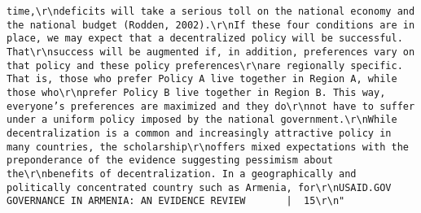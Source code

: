 \documentclass[
]{article}
\begin{document}
\begin{verbatim}
time,\r\ndeficits will take a serious toll on the national economy and the national budget (Rodden, 2002).\r\nIf these four conditions are in place, we may expect that a decentralized policy will be successful. That\r\nsuccess will be augmented if, in addition, preferences vary on that policy and these policy preferences\r\nare regionally specific. That is, those who prefer Policy A live together in Region A, while those who\r\nprefer Policy B live together in Region B. This way, everyone’s preferences are maximized and they do\r\nnot have to suffer under a uniform policy imposed by the national government.\r\nWhile decentralization is a common and increasingly attractive policy in many countries, the scholarship\r\noffers mixed expectations with the preponderance of the evidence suggesting pessimism about the\r\nbenefits of decentralization. In a geographically and politically concentrated country such as Armenia, for\r\nUSAID.GOV                                                     GOVERNANCE IN ARMENIA: AN EVIDENCE REVIEW       |  15\r\n"                                                                                                                                                                                                                                                                                                                                                                                                                                                                                                                                                                                                                                                                                     

\end{verbatim}
\end{document}
